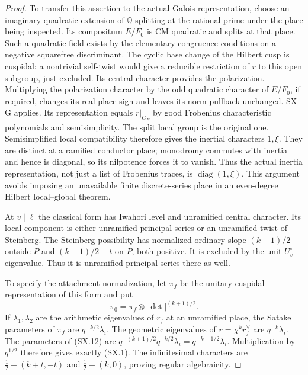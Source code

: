 \begin{proof}
To transfer this assertion to the actual Galois representation,
choose an imaginary quadratic extension of $\mathbb Q$ splitting
at the rational prime under the place being inspected.  Its
compositum $E/F_0$ is CM quadratic and splits at that place.
Such a quadratic field exists by the elementary congruence
conditions on a negative squarefree discriminant.
The cyclic base change of the Hilbert cusp is cuspidal: a
nontrivial self-twist would give a reducible restriction of $r$
to this open subgroup, just excluded.  Its central character
provides the polarization.  Multiplying the polarization character
by the odd quadratic character of $E/F_0$, if required, changes
its real-place sign and leaves its norm pullback unchanged.
SX-G applies.  Its representation equals $r|_{G_E}$ by good
Frobenius characteristic polynomials and semisimplicity.
The split local group is the original one.  Semisimplified local
compatibility therefore gives the inertial characters $1,\xi$.
They are distinct at a ramified conductor place; monodromy
commutes with inertia and hence is diagonal, so its nilpotence
forces it to vanish.  Thus the actual inertia representation,
not just a list of Frobenius traces, is
$\operatorname{diag}(1,\xi)$.  This argument avoids imposing
an unavailable finite discrete-series place in an even-degree
Hilbert local--global theorem.

At $v\mid\ell$ the classical form has Iwahori level and
unramified central character.  Its local component is either
unramified principal series or an unramified twist of Steinberg.
The Steinberg possibility has normalized ordinary slope
$(k-1)/2$ outside $P$ and $(k-1)/2+t$ on $P$, both positive.
It is excluded by the unit $U_v^\circ$ eigenvalue.  Thus it is
unramified principal series there as well.

To specify the attachment normalization, let $\pi_f$ be the
unitary cuspidal representation of this form and put
\[
              \pi_0=\pi_f\otimes
                         |\det|^{(k+1)/2}.          \tag{SX.12}
\]
If $\lambda_1,\lambda_2$ are the arithmetic eigenvalues of
$r_f$ at an unramified place, the Satake parameters of
$\pi_f$ are $q^{-k/2}\lambda_i$.  The geometric eigenvalues
of $r=\chi^k r_f^\vee$ are $q^{-k}\lambda_i$.
The parameters of (SX.12) are
$q^{-(k+1)/2}q^{-k/2}\lambda_i=q^{-k-1/2}\lambda_i$.
Multiplication by $q^{1/2}$ therefore gives exactly (SX.1).
The infinitesimal characters are $\frac12+(k+t,-t)$ and
$\frac12+(k,0)$, proving regular algebraicity.


\end{proof}
